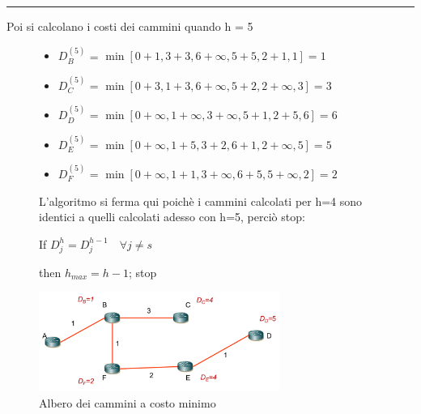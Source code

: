\vspace{1em}
\noindent\rule{\linewidth}{0.4pt}
\vspace{1em}


Poi si calcolano i costi dei cammini quando h = 5


\begin{figure}[h!]
    \begin{minipage}{0.6\textwidth}
    \begin{itemize}
   
    \item $D_B^{(5)}$ = $\min [0 + 1, 3 + 3, 6 + \infty, 5 + 5, 2 + 1, 1] = 1$
    
    \item $D_C^{(5)}$ = $\min [0 + 3, 1 + 3, 6 + \infty, 5 + 2, 2 + \infty, 3] = 3$
    
    \item $D_D^{(5)}$ = $\min [0 + \infty, 1 + \infty, 3 + \infty, 5 + 1, 2 + 5, 6] = 6$
    
    \item $D_E^{(5)}$ = $\min [0 + \infty, 1 + 5, 3 + 2, 6 + 1, 2 + \infty, 5] = 5$
    
    \item $D_F^{(5)}$ = $\min [0 + \infty, 1 + 1, 3 + \infty, 6 + 5, 5 + \infty, 2] = 2$
    \end{itemize}

    \end{minipage}\hfill
    \begin{minipage}{0.35\textwidth}
        \begin{center}
                    L'algoritmo si ferma qui poichè i cammini calcolati per h=4 sono identici a quelli calcolati adesso con h=5, perciò stop:

            If $D_j^{h} = D_j^{h-1} \quad \forall j \neq s$

        then $h_{max} = h - 1$; stop
        \end{center}
    \end{minipage}
\end{figure}





\begin{figure}[h!]
    \centering
    \includegraphics[width=0.7\textwidth]{images/bf7.png}
    \caption{Albero dei cammini a costo minimo}
    \label{fig:bf7}
\end{figure}

